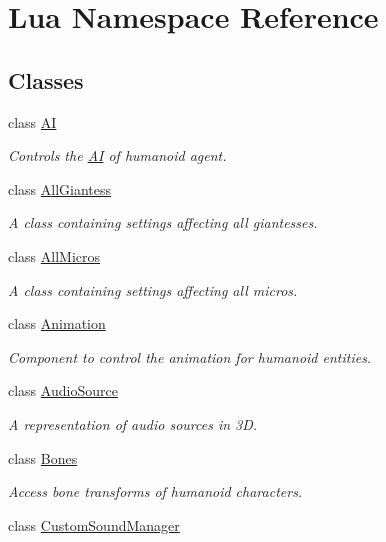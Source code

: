 \hypertarget{namespace_lua}{}\section{Lua Namespace Reference}
\label{namespace_lua}
\subsection*{Classes}
\begin{DoxyCompactItemize}
\item 
class \mbox{\hyperlink{class_lua_1_1_a_i}{AI}}
\begin{DoxyCompactList}\small\item\em Controls the \mbox{\hyperlink{class_lua_1_1_a_i}{AI}} of humanoid agent. \end{DoxyCompactList}\item 
class \mbox{\hyperlink{class_lua_1_1_all_giantess}{All\+Giantess}}
\begin{DoxyCompactList}\small\item\em A class containing settings affecting all giantesses. \end{DoxyCompactList}\item 
class \mbox{\hyperlink{class_lua_1_1_all_micros}{All\+Micros}}
\begin{DoxyCompactList}\small\item\em A class containing settings affecting all micros. \end{DoxyCompactList}\item 
class \mbox{\hyperlink{class_lua_1_1_animation}{Animation}}
\begin{DoxyCompactList}\small\item\em Component to control the animation for humanoid entities. \end{DoxyCompactList}\item 
class \mbox{\hyperlink{class_lua_1_1_audio_source}{Audio\+Source}}
\begin{DoxyCompactList}\small\item\em A representation of audio sources in 3D. \end{DoxyCompactList}\item 
class \mbox{\hyperlink{class_lua_1_1_bones}{Bones}}
\begin{DoxyCompactList}\small\item\em Access bone transforms of humanoid characters. \end{DoxyCompactList}\item 
class \mbox{\hyperlink{class_lua_1_1_custom_sound_manager}{Custom\+Sound\+Manager}}

\end{DoxyCompactItemize}
